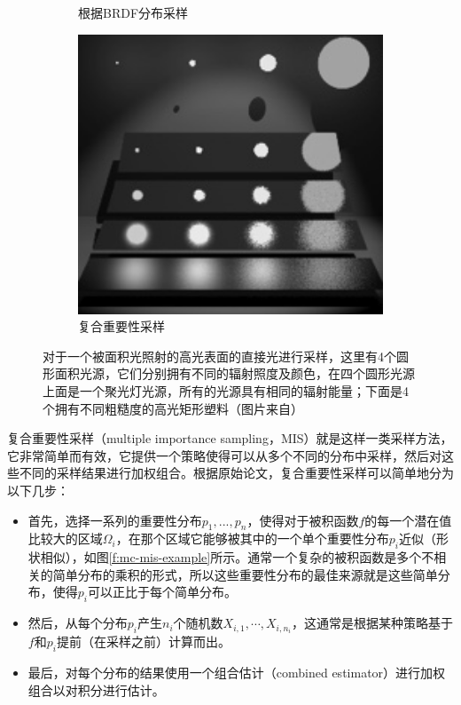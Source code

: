 \begin{figure}
\begin{subfigure}[b]{0.328\textwidth}
		\caption{根据BRDF分布采样}
	\end{subfigure}
	\begin{subfigure}[b]{0.328\textwidth}
		\includegraphics[width=1.0\textwidth]{figures/mc/mis-3}
		\caption{复合重要性采样}
	\end{subfigure}
	\caption{对于一个被面积光照射的高光表面的直接光进行采样，这里有4个圆形面积光源，它们分别拥有不同的辐射照度及颜色，在四个圆形光源上面是一个聚光灯光源，所有的光源具有相同的辐射能量；下面是4个拥有不同粗糙度的高光矩形塑料（图片来自\cite{a:OptimallyCombiningSamplingTechniquesforMonteCarloRendering}）}
	\label{f:mc-mis}
\end{figure}

复合重要性采样（multiple importance sampling，MIS）就是这样一类采样方法，它非常简单而有效，它提供一个策略使得可以从多个不同的分布中采样，然后对这些不同的采样结果进行加权组合。根据原始论文\cite{a:OptimallyCombiningSamplingTechniquesforMonteCarloRendering}，复合重要性采样可以简单地分为以下几步：

\begin{itemize}
	\item 首先，选择一系列的重要性分布$p_1,...,p_n$，使得对于被积函数$f$的每一个潜在值比较大的区域$\Omega_i$，在那个区域它能够被其中的一个单个重要性分布$p_i$近似（形状相似），如图\ref{f:mc-mis-example}所示。通常一个复杂的被积函数是多个不相关的简单分布的乘积的形式，所以这些重要性分布的最佳来源就是这些简单分布，使得$p_i$可以正比于每个简单分布。
	\item 然后，从每个分布$p_i$产生$n_i$个随机数$X_{i,1},\cdots,X_{i,n_i}$，这通常是根据某种策略基于$f$和$p_i$提前（在采样之前）计算而出。
	\item 最后，对每个分布的结果使用一个组合估计（combined estimator）进行加权组合以对积分进行估计。 
\end{itemize}


